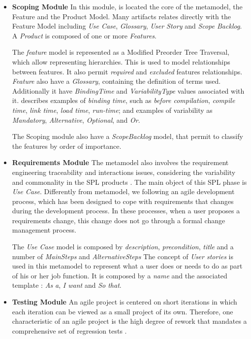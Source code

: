 \begin{itemize}
\item  \textbf{ Scoping Module } In this module, is located the core of the metamodel, the Feature and the Product Model. Many artifacts relates directly with the Feature Model including \textit{Use Case},  \textit{Glossary}, \textit{User Story} and \textit{Scope Backlog}. A  \textit{Product} is composed of one or more \textit{Features}.

The \textit{feature} model is represented as a Modified Preorder Tree Traversal, which allow representing hierarchies. This is used to model relationships between features. It also permit \textit{required} and \textit{excluded} features relationships. \textit{Feature} also have a \textit{Glossary}, containing the definition of terms used. Additionally it have \textit{BindingTime} and \textit{VariabilityType} values associated with it. \cite{Kang1990} describes examples of \textit{binding time}, such as \textit{before compilation}, \textit{compile time}, \textit{link time}, \textit{load time}, \textit{run-time}; and examples of variability as \textit{Mandatory}, \textit{Alternative}, \textit{Optional}, and \textit{Or}.

The Scoping module also have a \textit{ScopeBacklog} model, that permit to classify the features by order of importance. 

\item  \textbf{ Requirements Module }
The metamodel also involves the requirement engineering traceability and interactions issues, considering the variability and commonality in the SPL products \citep{CavalcantiInTech2012}. The main object of this SPL phase is \textit{Use Case}. Differently from \cite{CavalcantiInTech2012} metamodel, we following an agile development process, which has been designed to cope with requirements that changes during the development process. In these processes, when a user proposes a requirements change, this change does not go through a formal change management process.

The \textit{Use Case} model is composed by \textit{description}, \textit{precondition},  \textit{title} and a number of  \textit{MainSteps} and  \textit{AlternativeSteps}
The concept of \textit{ User stories } is used in this metamodel to represent what a user does or needs to do as part of his or her job function. It is composed by a \textit{name} and the associated template : \textit{As a},   \textit{I want} and \textit{So that}.

\item  \textbf{ Testing Module }
An agile project is centered on short iterations in which each iteration can be viewed as a small project of its own. Therefore, one characteristic of an agile project is the high degree of rework that mandates a comprehensive set of regression tests \citep{Goeschl2010}.


\end{itemize}
